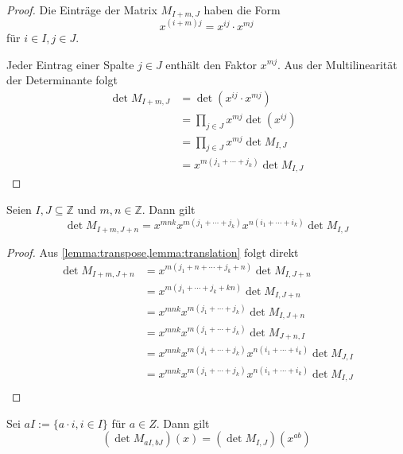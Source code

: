 \begin{proof}
    Die Einträge der Matrix $M_{I+m,J}$ haben die Form 
    \begin{equation*}
        x^{(i+m)j} = x^{ij} \cdot x^{mj}
    \end{equation*} für $i\in I, j\in J$.

    Jeder Eintrag einer Spalte $j \in J$ enthält den Faktor $x^{mj}$. Aus der Multilinearität der Determinante folgt
    \begin{align*}
        \det M_{I+m,J}  &= \det (x^{ij} \cdot x^{mj}) \\ 
                        &= \prod_{j \in J} x^{mj} \det (x^{ij}) \\ 
                        &= \prod_{j \in J} x^{mj}  \det M_{I,J} \\
                        &= x^{m(j_1+\cdots +j_k)} \det M_{I,J}
    \end{align*}
\end{proof}

\begin{satz}
    Seien $I,J \subseteq \mathbb{Z}$ und $m,n \in \mathbb{Z}$. Dann gilt
    \begin{equation*}
        \det{} M_{I+m,J+n} = x^{mnk} x^{m(j_1 +\cdots + j_k)} x^{n(i_1+\cdots +i_k)} \det{} M_{I,J}
    \end{equation*}
\end{satz}

\begin{proof}
    Aus \cref{lemma:transpose,lemma:translation} folgt direkt
    \begin{align*}
        \det{} M_{I+m,J+n}  &= x^{m(j_1 + n +\cdots + j_k + n)} \det{} M_{I,J+n} \\
                            &= x^{m(j_1 +\cdots + j_k + kn)} \det{} M_{I,J+n} \\
                            &= x^{mnk} x^{m(j_1 +\cdots + j_k)} \det{} M_{I,J+n} \\
                            &= x^{mnk} x^{m(j_1 +\cdots + j_k)} \det{} M_{J+n,I} \\
                            &= x^{mnk} x^{m(j_1 +\cdots + j_k)} x^{n(i_1+\cdots +i_k)} \det{} M_{J,I} \\
                            &= x^{mnk} x^{m(j_1 +\cdots + j_k)} x^{n(i_1+\cdots +i_k)} \det{} M_{I,J} \\
    \end{align*}
\end{proof}

\begin{satz}
    Sei $aI := \{ a \cdot i, i \in I\}$ für $a \in Z$. Dann gilt
    \begin{equation*}
        \left( \det{} M_{aI,bJ} \right) (x) = \left( \det{} M_{I,J} \right) (x^{ab})
    \end{equation*}
\end{satz}

